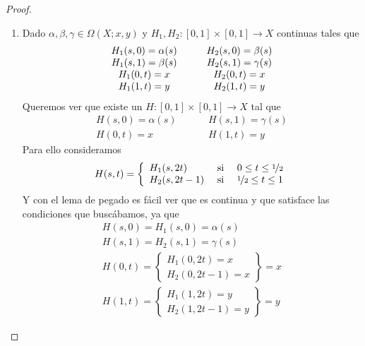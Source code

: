\begin{lema}
\begin{proof}
\begin{enumerate}[label=(\roman*)]
            \item Dado $\alpha, \beta, \gamma\in \Omega(X;x,y)$ y $H_1,H_2:[0,1]\times[0,1]\to X$ continuas tales que 
            \begin{gather*}
                \begin{array}{c c c c}
                    H_1(s,0) = \alpha(s) &&& H_2(s,0) = \beta(s)\\
                    H_1(s,1) = \beta(s) &&& H_2(s,1) = \gamma(s)\\
                    H_1(0,t) = x &&& H_2(0,t) = x\\
                    H_1(1, t) = y &&& H_2(1,t) = y
                \end{array}
            \end{gather*}
            Queremos ver que existe un $H:[0,1]\times [0,1]\to X$ tal que 
            \begin{align*}
                H(s,0) = \alpha(s) \hspace{1cm} & H(s,1) = \gamma(s)\\
                H(0,t) = x \hspace{1cm} & H(1,t) = y
            \end{align*}
            Para ello consideramos 
            \begin{gather*}
                H(s,t) = \left\{
                    \begin{array}{l c c}
                        H_1(s,2t) & \text{ si } & 0 \leq t \leq \nicefrac{1}{2}\\
                        H_2(s, 2t-1) & \text{ si } & \nicefrac{1}{2} \leq t \leq 1
                    \end{array}
                \right.
            \end{gather*}
            Y con el lema de pegado es fácil ver que es continua y que satisface las condiciones que buscábamos, ya que 
            \begin{gather*}
                H(s,0)=H_1(s,0) = \alpha(s)\\
                H(s,1)=H_2(s,1) = \gamma(s)\\
                H(0,t) = \left\{
                \begin{array}{l}
                    H_1(0,2t) = x\\
                    H_2(0,2t-1) = x
                \end{array}
                \right\} = x\\
                H(1,t) = \left\{
                \begin{array}{l}
                    H_1(1,2t) = y\\
                    H_2(1,2t-1) = y
                \end{array}
                \right\} = y
            \end{gather*}
        \end{enumerate}
    \end{proof}
\end{lema}

